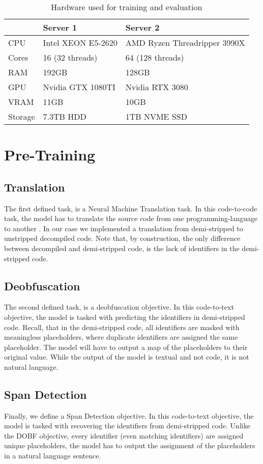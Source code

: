 \label{tab:server}
\begin{table}[!h]
\centering
\begin{tabular}{l|ll}
\hline
        & Server 1           & Server 2                     \\ \hline
CPU     & Intel XEON E5-2620 & AMD Ryzen Threadripper 3990X \\
Cores   & 16 (32 threads)    & 64 (128 threads)             \\
RAM     & 192GB              & 128GB                        \\
GPU     & Nvidia GTX 1080TI  & Nvidia RTX 3080              \\
VRAM    & 11GB               & 10GB                         \\
Storage & 7.3TB HDD          & 1TB NVME SSD                
\end{tabular}
\caption{Hardware used for training and evaluation}
\end{table}

\section{Pre-Training}

\subsection{Translation}
The first defined task, is a Neural Machine Translation task. In this code-to-code task, the model has to translate the source code from one programming-language to another \cite{CodeXGlue}. In our case we implemented a translation from demi-stripped to unstripped decompiled code. Note that, by construction, the only difference between decompiled and demi-stripped code, is the lack of identifiers in the demi-stripped code.


\subsection{Deobfuscation}
The second defined task, is a deobfuscation objective. In this code-to-text objective, the model is tasked with predicting the identifiers in demi-stripped code. Recall, that in the demi-stripped code, all identifiers are masked with meaningless placeholders, where duplicate identifiers are assigned the same placeholder. The model will have to output a map of the placeholders to their original value. While the output of the model is textual and not code, it is not natural language.


\subsection{Span Detection}
Finally, we define a Span Detection objective. In this code-to-text objective, the model is tasked with recovering the identifiers from demi-stripped code. Unlike the DOBF objective, every identifier (even matching identifiers) are assigned unique placeholders, the model has to output the assignment of the placeholders in a natural language sentence.

